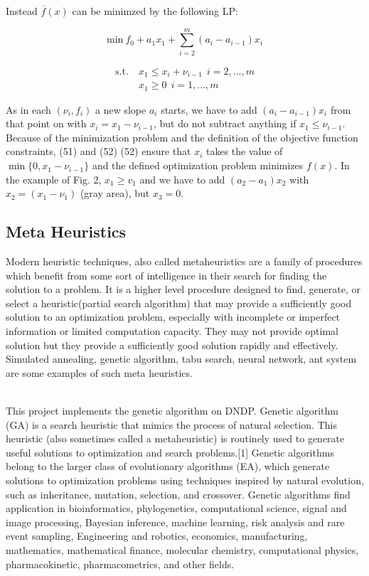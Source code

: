 \documentclass[a4paper, 12pt]{article}
\begin{document}
Instead $\overline{f}(x)$ can be minimzed by the following LP:
\begin{large}
\begin{equation*}
\mathrm{min}\ f_{0}+a_{1}x_{1}+\sum_{i=2}^m\left(a_{i}-a_{i-1}\right)x_{i}
\end{equation*}
\end{large}
\begin{large}
\begin{align*}
\mathrm{s.t.}\ &x_{1}\leq x_{i}+\nu_{i-1}\ \ i=2,...,m \\
&x_{1}\geq0\ \ i=1,...,m
\end{align*}
\end{large}
As in each $\left(\nu_{i},f_{i}\right)$ a new slope $a_i$ starts, we have to add $\left(a_i-a_{i-1}\right)x_{i}$ from that point on with $x_{i}=x_{1}-\nu_{i-1}$, but do not subtract anything if $x_{1} \le \nu_{i-1}$. Because of the minimization problem and the definition of the objective function constraints, (51) and (52) (52) ensure that $x_{i}$ takes the value of $\min\{0,x_{1}-\nu_{i-1}\}$ and the defined optimization problem minimizes $f(x)$. In the example of Fig. 2, $x_1 \ge v_1$ and we have to add $\left(a_2 - a_1\right)x_2$ with $x_2=\left(x_1-\nu_1\right)$ (gray area), but $x_3=0$.

\subsection{Meta Heuristics}
Modern heuristic techniques, also called metaheuristics are a family of procedures which benefit from some sort of intelligence in their search for finding the solution to a problem. It is a higher level procedure designed to find, generate, or select a heuristic(partial search algorithm) that may provide a sufficiently good solution to an optimization problem, especially with incomplete or imperfect information or limited computation capacity. They may not provide optimal solution but they provide a sufficiently good solution rapidly and effectively. Simulated annealing, genetic algorithm, tabu search, neural network, ant system are some examples of such meta heuristics.\par
\noindent
\\This project implements the genetic algorithm on DNDP. Genetic algorithm (GA) is a search heuristic that mimics the process of natural selection. This heuristic (also sometimes called a metaheuristic) is routinely used to generate useful solutions to optimization and search problems.[1] Genetic algorithms belong to the larger class of evolutionary algorithms (EA), which generate solutions to optimization problems using techniques inspired by natural evolution, such as inheritance, mutation, selection, and crossover. Genetic algorithms find application in bioinformatics, phylogenetics, computational science, signal and image processing, Bayesian inference, machine learning, risk analysis and rare event sampling, Engineering and robotics, economics, manufacturing, mathematics, mathematical finance, molecular chemistry, computational physics, pharmacokinetic, pharmacometrics, and other fields.\par
\newpage
\end{document}

